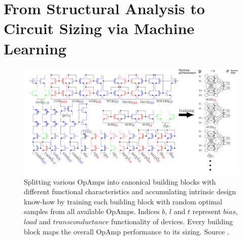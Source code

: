 \documentclass[conference]{IEEEtran}
\begin{document}
	 
	 	
 	\section{From Structural Analysis to Circuit Sizing via Machine Learning}\label{sec:intro2}
	\begin{figure}[h]
		\centering
        \includegraphics[width=\linewidth]{figures/struct_overview_incl_partition}
		\setlength{\abovecaptionskip}{0ex}%
		\setlength{\belowcaptionskip}{-2ex}%
		\caption{Splitting various OpAmps into canonical building blocks with different functional characteristics and accumulating intrinsic design know-how by training each building block with random optimal samples from all available OpAmps. Indices {\color{red} $b$}, {\color{blue} $l$} and {\color{green} $t$} represent {\color{red}$bias$}, {\color{blue}$load$} and {\color{green}$transconductance$} functionality of devices. Every building block maps the overall OpAmp performance to its sizing. Source \cite{leibl24inverse}.}
		\label{fig:overview-structure}
	\end{figure}
	\setlength{\abovecaptionskip}{1ex}%
	\setlength{\belowcaptionskip}{-3ex}%
\end{document}
